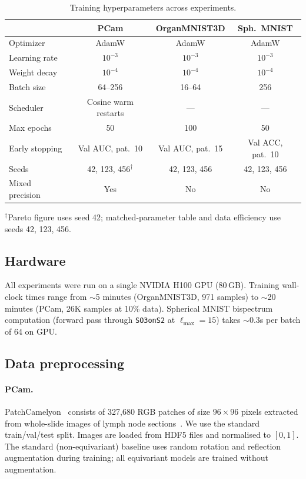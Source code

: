 \documentclass{article}
\theoremstyle{definition}
\theoremstyle{remark}
\theoremstyle{definition}
\begin{document}
\begin{table}[h]
  \caption{Training hyperparameters across experiments.}
  \label{tab:hyperparams}
  \centering
  \small
  \setlength{\tabcolsep}{4pt}
  \begin{tabular}{lccc}
    \toprule
    & PCam & OrganMNIST3D & Sph.\ MNIST \\
    \midrule
    Optimizer      & AdamW & AdamW & AdamW \\
    Learning rate  & $10^{-3}$ & $10^{-3}$ & $10^{-3}$ \\
    Weight decay   & $10^{-4}$ & $10^{-4}$ & $10^{-4}$ \\
    Batch size     & 64--256 & 16--64 & 256 \\
    Scheduler      & Cosine warm restarts & --- & --- \\
    Max epochs     & 50 & 100 & 50 \\
    Early stopping & Val AUC, pat.\ 10 & Val AUC, pat.\ 15 & Val ACC, pat.\ 10 \\
    Seeds          & 42, 123, 456$^\dagger$ & 42, 123, 456 & 42, 123, 456 \\
    Mixed precision & Yes & No & No \\
    \bottomrule
  \end{tabular}

  \vspace{0.3em}
  {\small $^\dagger$Pareto figure uses seed 42; matched-parameter table and data efficiency use seeds 42, 123, 456.}
\end{table}

\subsection{Hardware}

All experiments were run on a single NVIDIA H100 GPU (80\,GB).
Training wall-clock times range from ${\sim}$5 minutes (OrganMNIST3D,
971 samples) to ${\sim}$20 minutes (PCam, 26K samples at 10\% data).
Spherical MNIST bispectrum computation (forward pass through
\texttt{SO3onS2} at $\ell_{\max} = 15$) takes ${\sim}$0.3s per batch
of 64 on GPU.

\subsection{Data preprocessing}

\paragraph{PCam.}
PatchCamelyon~\citep{veeling2018rotation} consists of 327{,}680 RGB
patches of size $96 \times 96$ pixels extracted from whole-slide
images of lymph node sections~\citep{bejnordi2017camelyon}. We use
the standard train/val/test split. Images are loaded from HDF5 files
and normalised to $[0, 1]$. The standard (non-equivariant) baseline
uses random rotation and reflection augmentation during training; all
equivariant models are trained without augmentation.
\end{document}
